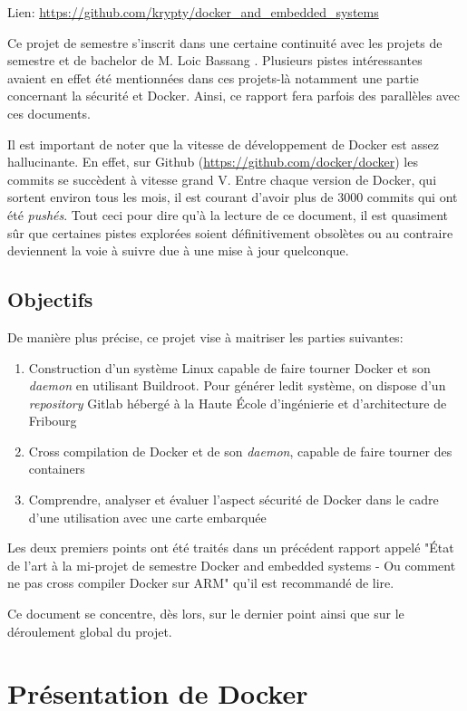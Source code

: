 \documentclass[11pt,a4paper,oneside]{report}
\newcommand{\school}{Haute École d'ingénierie et d'architecture de Fribourg}
\newcommand{\oldreportname}{État de l’art à la mi-projet de semestre Docker and embedded systems - Ou comment ne pas cross compiler Docker sur ARM}
\begin{document}
Lien: \url{https://github.com/krypty/docker_and_embedded_systems}

Ce projet de semestre s'inscrit dans une certaine continuité avec les projets de semestre et de bachelor de M. Loic Bassang \cite{bassang_bachelor}. Plusieurs pistes intéressantes avaient en effet été mentionnées dans ces projets-là notamment une partie concernant la sécurité et Docker. Ainsi, ce rapport fera parfois des parallèles avec ces documents.

Il est important de noter que la vitesse de développement de Docker est assez hallucinante. En effet, sur Github (\url{https://github.com/docker/docker}) les commits se succèdent à vitesse grand V. Entre chaque version de Docker, qui sortent environ tous les mois, il est courant d'avoir plus de 3000 commits qui ont été \emph{pushés}. Tout ceci pour dire qu'à la lecture de ce document, il est quasiment sûr que certaines pistes explorées soient définitivement obsolètes ou au contraire deviennent la voie à suivre due à une mise à jour quelconque.


\section{Objectifs}

De manière plus précise, ce projet vise à maitriser les parties suivantes:

\begin{enumerate}
  \item Construction d'un système Linux capable de faire tourner Docker et son \emph{daemon} en utilisant Buildroot. Pour générer ledit système, on dispose d'un \emph{repository} Gitlab hébergé à la \school

  \item Cross compilation de Docker et de son \emph{daemon}, capable de faire tourner des containers

  \item Comprendre, analyser et évaluer l'aspect sécurité de Docker dans le cadre d'une utilisation avec une carte embarquée
\end{enumerate}

Les deux premiers points ont été traités dans un précédent rapport appelé "\oldreportname" qu'il est recommandé de lire.

Ce document se concentre, dès lors, sur le dernier point ainsi que sur le déroulement global du projet.


\chapter{Présentation de Docker}
\end{document}
